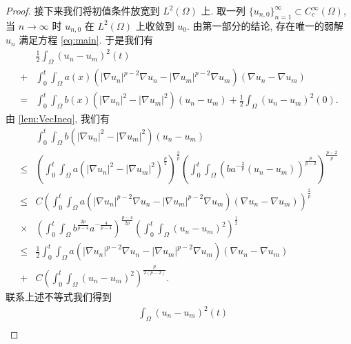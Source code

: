\documentclass[oneside,longtitle]{LZUthesis}
\theoremstyle{definition}
\numberwithin{equation}{chapter}
\newcommand*\abs[1]{\lvert#1\rvert}
\newcommand*\Brace[1]{\lbrace#1\rbrace}
\begin{document}
\begin{proof}
	接下来我们将初值条件放宽到 $L^2(\Omega)$ 上.
	取一列 $\Brace{u_{n, 0}}_{n=1}^{\infty} \subset C_c^{\infty}(\Omega)$,
	当 $n \to \infty $ 时 $u_{n, 0}$ 在 $L^2(\Omega)$ 上收敛到 $u_0$.
	由第一部分的结论, 存在唯一的弱解 $u_n$ 满足方程 \eqref{eq:main}.
	于是我们有
	\begin{equation}
		\begin{split}
			& \frac{1}{2}\int_{\Omega}\left(u_n-u_m\right)^2(t)\\
			+{} & \int_{0}^{t}\int_{\Omega}a(x)
			\left(\abs{\nabla u_n}^{p-2}\nabla u_n
			- \abs{\nabla u_m}^{p-2}\nabla u_m\right)
			\left(\nabla u_n - \nabla u_m\right)\\
			={} & \int_{0}^{t}\int_{\Omega}b(x)\left(\abs{\nabla u_n}^2
			- \abs{\nabla u_m}^2\right)\left(u_n - u_m\right)
			+ \frac{1}{2}\int_{\Omega}\left(u_n-u_m\right)^2(0).
		\end{split}
	\end{equation}
	由 \cref{lem:VecIneq}, 我们有
	\begin{equation}
		\begin{split}
			& \int_{0}^{t}\int_{\Omega}b\left(\abs{\nabla u_n}^2
			- \abs{\nabla u_m}^2\right)\left(u_n - u_m\right)\\
			\leq{} & \left(\int_0^t\int_{\Omega}a\left(\abs{\nabla u_n}^2
			- \abs{\nabla u_m}^2\right)^{\frac{p}{2}}\right)^{\frac{2}{p}}
			\left(\int_0^t\int_{\Omega}\left(ba^{-\frac{2}{p}}
			\left(u_n-u_m\right)\right)^{\frac{p}{p-2}}\right)^{\frac{p-2}{p}}\\
			\leq{} & C\left(\int_0^t\int_{\Omega}a
			\left(\abs{\nabla u_n}^{p-2}\nabla u_n
			- \abs{\nabla u_m}^{p-2}\nabla u_m\right)
			\left(\nabla u_n - \nabla u_m\right)\right)^{\frac{2}{p}}\\
			\times{} & \left(\int_0^t\int_{\Omega}b^{\frac{2p}{p-4}}a^{-\frac{4}{p-4}}\right)^{\frac{p-4}{2p}}
			\left(\int_0^t\int_{\Omega}\left(u_n-u_m\right)^2\right)^{\frac{1}{2}}\\
			\leq{} & \frac{1}{2}\int_0^t\int_{\Omega}a
			\left(\abs{\nabla u_n}^{p-2}\nabla u_n
			- \abs{\nabla u_m}^{p-2}\nabla u_m\right)
			\left(\nabla u_n - \nabla u_m\right)\\
			+{} & C\left(\int_0^t\int_{\Omega}\left(u_n-u_m\right)^2\right)^{\frac{p}{2(p-2)}}.
		\end{split}
	\end{equation}
	联系上述不等式我们得到
	\begin{equation}\label{un-umL2_0TW1p_bd_0TL2_L20}
		\begin{split}
			& \int_{\Omega}\left(u_n-u_m\right)^2(t)\\

\end{split}
\end{equation}
\end{proof}
\end{document}
